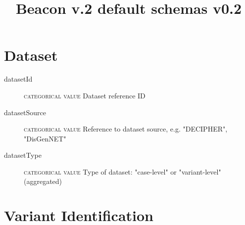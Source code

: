 \documentclass[a4paper, 10pt]{article}        %
\begin{document}
\title{Beacon v.2 default schemas v0.2}
\date{} %
\maketitle





 \section*{{\color{teal}Dataset}}
 \begin{description}
  	\item[datasetId] {\textsc{categorical value}} Dataset reference ID
	\item[datasetSource] {\textsc{categorical value}} Reference to dataset source, e.g. "DECIPHER", "DisGenNET"
	\item[datasetType] {\textsc{categorical value}} Type of dataset: "case-level" or "variant-level" (aggregated)  
  \end{description}


\section*{{\color{teal}Variant Identification}}

\end{document}
